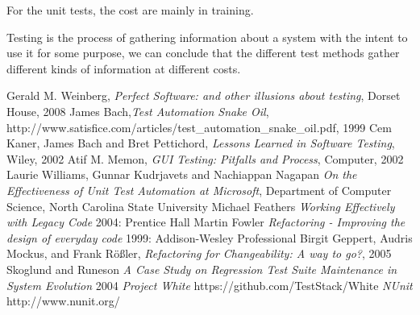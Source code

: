 \documentclass{article}
\begin{document}
		For the unit tests, the cost are mainly in training. 

		Testing is the process of gathering information about a system with the intent to use it for some purpose, we can conclude that the different test methods gather different kinds of information at different costs.



\begin{thebibliography}{1}
 Gerald M. Weinberg, {\em Perfect Software: and other illusions about testing}, Dorset House, 2008
 James Bach,{\em Test Automation Snake Oil}, http://www.satisfice.com/articles/test\_automation\_snake\_oil.pdf, 1999 
 Cem Kaner, James Bach and Bret Pettichord, {\em Lessons Learned in Software Testing}, Wiley, 2002
 Atif M. Memon, {\em GUI Testing: Pitfalls and Process}, Computer, 2002
 Laurie Williams, Gunnar Kudrjavets and Nachiappan Nagapan {\em On the Effectiveness of Unit Test Automation at Microsoft}, Department of Computer Science, North Carolina State University
 Michael Feathers {\em Working Effectively with Legacy Code} 2004: Prentice Hall
 Martin Fowler {\em Refactoring - Improving the design of everyday code} 1999: Addison-Wesley Professional
 Birgit Geppert, Audris Mockus, and Frank Rößler, {\em Refactoring for Changeability: A way to go?}, 2005
 Skoglund and Runeson {\em A Case Study on Regression Test Suite Maintenance in System Evolution} 2004 
 {\em Project White} https://github.com/TestStack/White
 {\em NUnit} http://www.nunit.org/
\end{thebibliography}
\end{document}
